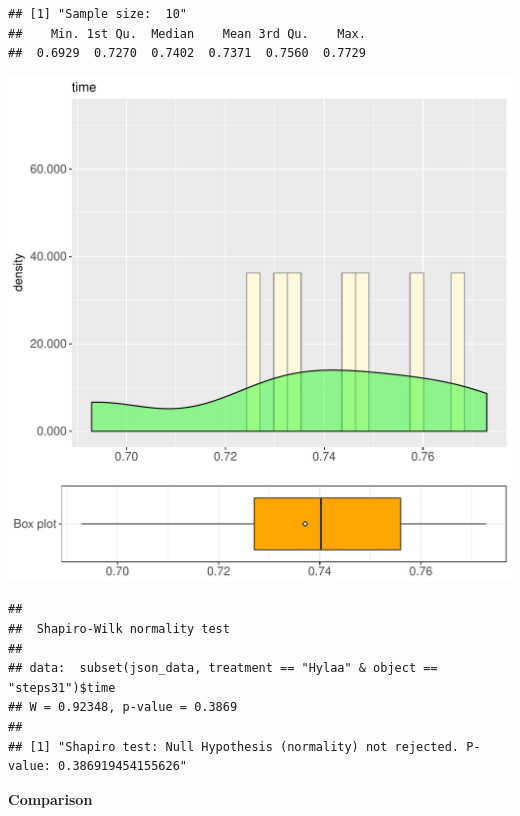 \documentclass{article}\usepackage[]{graphicx}\usepackage[]{color}
\makeatletter
\def\maxwidth{ %
  \ifdim\Gin@nat@width>\linewidth
    \linewidth
  \else
    \Gin@nat@width
  \fi
}
\newenvironment{kframe}{%
 \def\at@end@of@kframe{}%
 \ifinner\ifhmode%
  \def\at@end@of@kframe{\end{minipage}}%
  \begin{minipage}{\columnwidth}%
 \fi\fi%
 \def\FrameCommand##1{\hskip\@totalleftmargin \hskip-\fboxsep
 \colorbox{shadecolor}{##1}\hskip-\fboxsep
     \hskip-\linewidth \hskip-\@totalleftmargin \hskip\columnwidth}%
 \MakeFramed {\advance\hsize-\width
   \@totalleftmargin\z@ \linewidth\hsize
   \@setminipage}}%
 {\par\unskip\endMakeFramed%
 \at@end@of@kframe}
\newenvironment{knitrout}{}{} %
\makeatother
\begin{document}
\begin{knitrout}
\color{fgcolor}\begin{kframe}
\begin{verbatim}
## [1] "Sample size:  10"
##    Min. 1st Qu.  Median    Mean 3rd Qu.    Max. 
##  0.6929  0.7270  0.7402  0.7371  0.7560  0.7729
\end{verbatim}
\end{kframe}
\includegraphics[width=\maxwidth]{figure/RH2_Hylaa_steps31-1} 
\begin{kframe}\begin{verbatim}
## 
## 	Shapiro-Wilk normality test
## 
## data:  subset(json_data, treatment == "Hylaa" & object == "steps31")$time
## W = 0.92348, p-value = 0.3869
## 
## [1] "Shapiro test: Null Hypothesis (normality) not rejected. P-value: 0.386919454155626"
\end{verbatim}
\end{kframe}
\end{knitrout}
  
 \textbf{Comparison}
  
\end{document}
